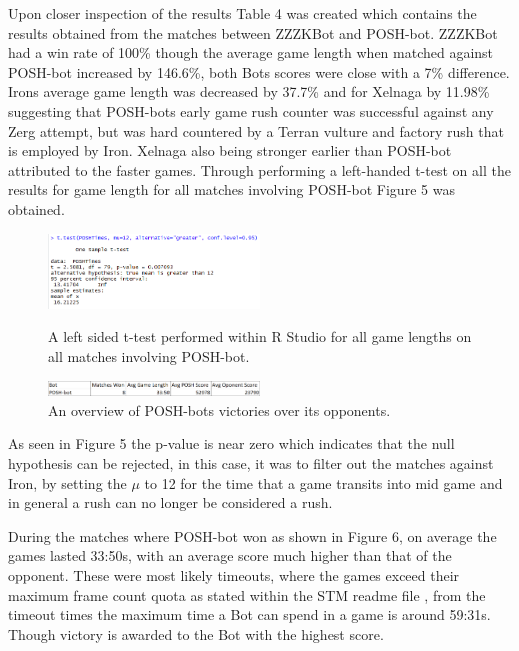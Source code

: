 \documentclass[journal]{IEEEtran}
\begin{document}
	Upon closer inspection of the results Table 4 was created which contains the results obtained from the matches between ZZZKBot and POSH-bot. ZZZKBot had a win rate of 100\% though the average game length when matched against POSH-bot increased by 146.6\%, both Bots scores were close with a 7\% difference. Irons average game length was decreased by 37.7\% and for Xelnaga by 11.98\% suggesting that POSH-bots early game rush counter was successful against any Zerg attempt, but was hard countered by a Terran vulture and factory rush that is employed by Iron. Xelnaga also being stronger earlier than POSH-bot attributed to the faster games. Through performing a left-handed t-test on all the results for game length for all matches involving POSH-bot Figure 5 was obtained.
	
	\begin{figure}[H]
		\centering
		\includegraphics[width=0.5\textwidth]{RPoshTimeLeft}
		\caption{A left sided t-test performed within R Studio for all game lengths on all matches involving POSH-bot.}
		\label{Fig5}
		\centering
		\includegraphics[width=0.5\textwidth]{PoshWinsandScore}
		\caption{An overview of POSH-bots victories over its opponents.}
		\label{poshonly}
	\end{figure}
	
	As seen in Figure 5 the p-value is near zero which indicates that the null hypothesis can be rejected, in this case, it was to filter out the matches against Iron, by setting the $\mu$ to 12 for the time that a game transits into mid game and in general a rush can no longer be considered a rush. 
	
	During the matches where POSH-bot won as shown in Figure 6, on average the games lasted 33:50s, with an average score much higher than that of the opponent. These were most likely timeouts, where the games exceed their maximum frame count quota as stated within the STM readme file \cite{Tournament}, from the timeout times the maximum time a Bot can spend in a game is around 59:31s. Though victory is awarded to the Bot with the highest score.
	
\end{document}
